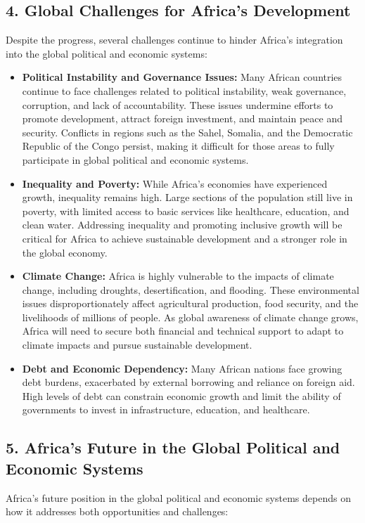 \documentclass[10pt]{article}
\begin{document}
\subsection*{4. Global Challenges for Africa's Development}
Despite the progress, several challenges continue to hinder Africa's integration into the global
political and economic systems:

\begin{itemize}
  \item \textbf{Political Instability and Governance Issues:} Many African countries continue to face
    challenges related to political instability, weak governance, corruption, and lack of
    accountability. These issues undermine efforts to promote development, attract foreign
    investment, and maintain peace and security. Conflicts in regions such as the Sahel,
    Somalia, and the Democratic Republic of the Congo persist, making it difficult for those
    areas to fully participate in global political and economic systems.

  \item \textbf{Inequality and Poverty:} While Africa's economies have experienced growth, inequality
    remains high. Large sections of the population still live in poverty, with limited access to
    basic services like healthcare, education, and clean water. Addressing inequality and
    promoting inclusive growth will be critical for Africa to achieve sustainable development
    and a stronger role in the global economy.

  \item \textbf{Climate Change:} Africa is highly vulnerable to the impacts of climate change, including
    droughts, desertification, and flooding. These environmental issues disproportionately
    affect agricultural production, food security, and the livelihoods of millions of people. As
    global awareness of climate change grows, Africa will need to secure both financial and
    technical support to adapt to climate impacts and pursue sustainable development.

  \item \textbf{Debt and Economic Dependency:} Many African nations face growing debt burdens,
    exacerbated by external borrowing and reliance on foreign aid. High levels of debt can
    constrain economic growth and limit the ability of governments to invest in
    infrastructure, education, and healthcare.
\end{itemize}

\subsection*{5. Africa's Future in the Global Political and Economic Systems}
Africa's future position in the global political and economic systems depends on how it
addresses both opportunities and challenges:
\end{document}
